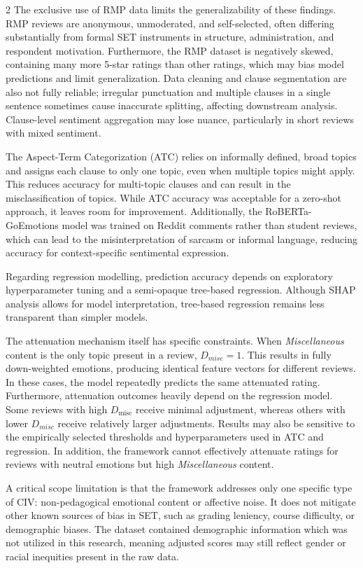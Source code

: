 \documentclass{article}
\begin{document}
\begin{multicols*}{2}
The exclusive use of RMP data limits the generalizability of these findings. RMP reviews are anonymous, unmoderated, and self-selected, often differing substantially from formal SET instruments in structure, administration, and respondent motivation. Furthermore, the RMP dataset is negatively skewed, containing many more 5-star ratings than other ratings, which may bias model predictions and limit generalization. Data cleaning and clause segmentation are also not fully reliable; irregular punctuation and multiple clauses in a single sentence sometimes cause inaccurate splitting, affecting downstream analysis. Clause-level sentiment aggregation may lose nuance, particularly in short reviews with mixed sentiment.

The Aspect-Term Categorization (ATC) relies on informally defined, broad topics and assigns each clause to only one topic, even when multiple topics might apply. This reduces accuracy for multi-topic clauses and can result in the misclassification of topics. While ATC accuracy was acceptable for a zero-shot approach, it leaves room for improvement. Additionally, the RoBERTa-GoEmotions model was trained on Reddit comments rather than student reviews, which can lead to the misinterpretation of sarcasm or informal language, reducing accuracy for context-specific sentimental expression. 

Regarding regression modelling, prediction accuracy depends on exploratory hyperparameter tuning and a semi-opaque tree-based regression. Although SHAP analysis allows for model interpretation, tree-based regression remains less transparent than simpler models.

The attenuation mechanism itself has specific constraints. When \textit{Miscellaneous} content is the only topic present in a review, $D_{misc} = 1$. This results in fully down-weighted emotions, producing identical feature vectors for different reviews. In these cases, the model repeatedly predicts the same attenuated rating. Furthermore, attenuation outcomes heavily depend on the regression model. Some reviews with high $D_\text{misc}$ receive minimal adjustment, whereas others with lower $D_{misc}$ receive relatively larger adjustments. Results may also be sensitive to the empirically selected thresholds and hyperparameters used in ATC and regression. In addition, the framework cannot effectively attenuate ratings for reviews with neutral emotions but high \textit{Miscellaneous} content.

A critical scope limitation is that the framework addresses only one specific type of CIV: non-pedagogical emotional content or affective noise. It does not mitigate other known sources of bias in SET, such as grading leniency, course difficulty, or demographic biases. The dataset contained demographic information which was not utilized in this research, meaning adjusted scores may still reflect gender or racial inequities present in the raw data.


\end{multicols*}
\end{document}
